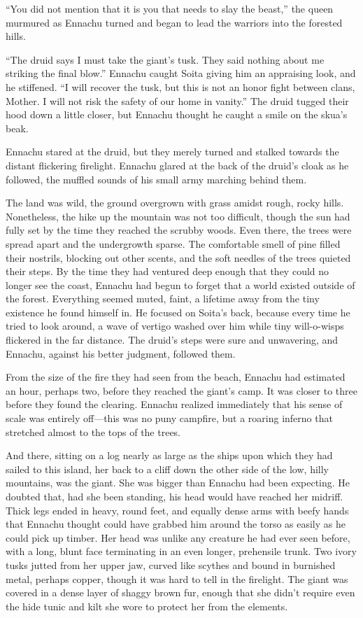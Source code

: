 ``You did not mention that it is you that needs to slay the beast,'' the queen murmured as Ennachu turned and began to lead the warriors into the forested hills.

``The druid says I must take the giant's tusk. They said nothing about me striking the final blow.'' Ennachu caught Soita giving him an appraising look, and he stiffened. ``I will recover the tusk, but this is not an honor fight between clans, Mother. I will not risk the safety of our home in vanity.'' The druid tugged their hood down a little closer, but Ennachu thought he caught a smile on the skua's beak.

Ennachu stared at the druid, but they merely turned and stalked towards the distant flickering firelight. Ennachu glared at the back of the druid's cloak as he followed, the muffled sounds of his small army marching behind them.

The land was wild, the ground overgrown with grass amidst rough, rocky hills. Nonetheless, the hike up the mountain was not too difficult, though the sun had fully set by the time they reached the scrubby woods. Even there, the trees were spread apart and the undergrowth sparse. The comfortable smell of pine filled their nostrils, blocking out other scents, and the soft needles of the trees quieted their steps. By the time they had ventured deep enough that they could no longer see the coast, Ennachu had begun to forget that a world existed outside of the forest. Everything seemed muted, faint, a lifetime away from the tiny existence he found himself in. He focused on Soita's back, because every time he tried to look around, a wave of vertigo washed over him while tiny will-o-wisps flickered in the far distance. The druid's steps were sure and unwavering, and Ennachu, against his better judgment, followed them.

From the size of the fire they had seen from the beach, Ennachu had estimated an hour, perhaps two, before they reached the giant's camp. It was closer to three before they found the clearing. Ennachu realized immediately that his sense of scale was entirely off---this was no puny campfire, but a roaring inferno that stretched almost to the tops of the trees.

And there, sitting on a log nearly as large as the ships upon which they had sailed to this island, her back to a cliff down the other side of the low, hilly mountains, was the giant. She was bigger than Ennachu had been expecting. He doubted that, had she been standing, his head would have reached her midriff. Thick legs ended in heavy, round feet, and equally dense arms with beefy hands that Ennachu thought could have grabbed him around the torso as easily as he could pick up timber. Her head was unlike any creature he had ever seen before, with a long, blunt face terminating in an even longer, prehensile trunk. Two ivory tusks jutted from her upper jaw, curved like scythes and bound in burnished metal, perhaps copper, though it was hard to tell in the firelight. The giant was covered in a dense layer of shaggy brown fur, enough that she didn't require even the hide tunic and kilt she wore to protect her from the elements.

